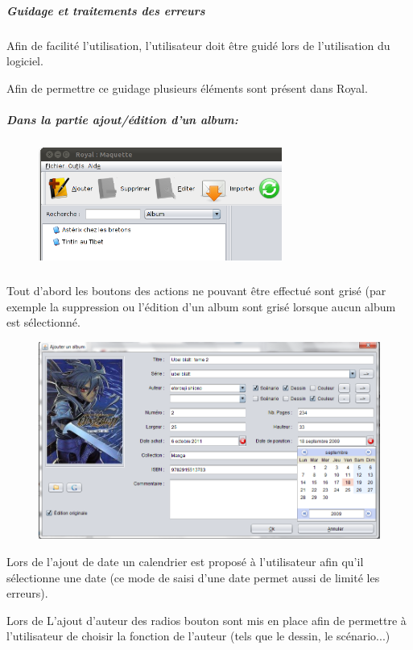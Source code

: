 \documentclass[etudiants]{support-iutrs}
\begin{document}
\subparagraph{Guidage et traitements des erreurs} 
Afin de facilité l'utilisation, l'utilisateur doit être guidé lors de l'utilisation du logiciel.

Afin de permettre ce guidage plusieurs éléments sont présent dans Royal.

\subparagraph{Dans la partie ajout/édition d'un album:}
\subparagraph{}

\begin{figure}
\includegraphics[width=8cm]{img/app_pc_maquette_btn_grise.png}
\end{figure}\subparagraph{}

Tout d'abord les boutons des actions ne pouvant être effectué sont grisé (par exemple la suppression ou l’édition d'un album sont grisé lorsque aucun album est sélectionné.
\clearpage

\begin{figure}[h!]
\begin{center}
\includegraphics[width=12cm]{img/app_pc_maquette_ajout_album.png}
\end{center}
\end{figure}
Lors de l'ajout de date un calendrier est proposé à l'utilisateur afin qu’il sélectionne une date (ce mode de saisi d'une date permet aussi de limité les erreurs).

Lors de L'ajout d'auteur des radios bouton sont mis en place afin de permettre à l'utilisateur de choisir la fonction de l'auteur (tels que le dessin, le scénario...)
\end{document}
